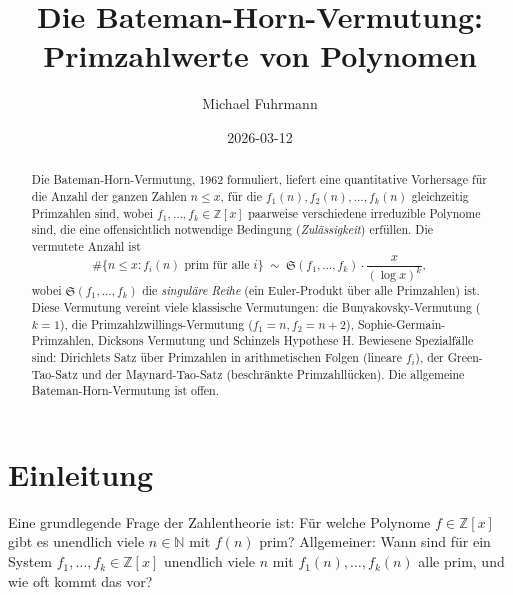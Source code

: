 \documentclass[12pt,a4paper]{amsart}
\theoremstyle{definition}
\theoremstyle{remark}
\newcommand{\Z}{\mathbb{Z}}
\newcommand{\N}{\mathbb{N}}
\newcommand{\BH}{\mathfrak{S}}
\begin{document}

\title{Die Bateman-Horn-Vermutung:\\
  Primzahlwerte von Polynomen}

\author{Michael Fuhrmann}
\address{Specialist Mathematics Project, Build 167}
\date{2026-03-12}

\begin{abstract}
Die Bateman-Horn-Vermutung, 1962 formuliert, liefert eine quantitative Vorhersage für
die Anzahl der ganzen Zahlen $n \leq x$, für die $f_1(n), f_2(n), \ldots, f_k(n)$
gleichzeitig Primzahlen sind, wobei $f_1,\ldots,f_k \in \Z[x]$ paarweise verschiedene
irreduzible Polynome sind, die eine offensichtlich notwendige Bedingung
(\emph{Zulässigkeit}) erfüllen.
Die vermutete Anzahl ist
\[
  \#\{n \leq x : f_i(n) \text{ prim für alle } i\} \;\sim\;
  \BH(f_1,\ldots,f_k) \cdot \frac{x}{(\log x)^k},
\]
wobei $\BH(f_1,\ldots,f_k)$ die \emph{singuläre Reihe} (ein Euler-Produkt über alle
Primzahlen) ist.
Diese Vermutung vereint viele klassische Vermutungen: die Bunyakovsky-Vermutung
($k=1$), die Primzahlzwillings-Vermutung ($f_1 = n, f_2 = n+2$), Sophie-Germain-Primzahlen,
Dicksons Vermutung und Schinzels Hypothese H.
Bewiesene Spezialfälle sind: Dirichlets Satz über Primzahlen in arithmetischen
Folgen (lineare $f_i$), der Green-Tao-Satz und der Maynard-Tao-Satz
(beschränkte Primzahllücken).
Die allgemeine Bateman-Horn-Vermutung ist offen.
\end{abstract}

\maketitle

\tableofcontents

\section{Einleitung}

Eine grundlegende Frage der Zahlentheorie ist: Für welche Polynome $f \in \Z[x]$ gibt
es unendlich viele $n \in \N$ mit $f(n)$ prim? Allgemeiner: Wann sind für ein System
$f_1, \ldots, f_k \in \Z[x]$ unendlich viele $n$ mit $f_1(n),\ldots,f_k(n)$ alle prim,
und wie oft kommt das vor?
\end{document}
